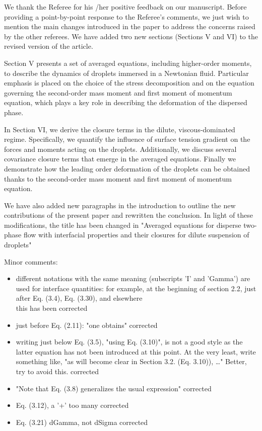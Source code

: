\documentclass[10pt,a4paper]{article}
\newcommand{\tb}[1]{\color{blue}#1\color{black}}
\begin{document}
\tb{
We thank the Referee for his /her positive feedback on our manuscript. 
Before providing a point-by-point response to the Referee’s comments, we just wish to mention the main changes introduced in the paper to address the concerns raised by the other referees.
We have added two new sections (Sections V and VI) to the revised version of the article.

Section V presents a set of averaged equations, including higher-order moments, to describe the dynamics of droplets immersed in a Newtonian fluid. 
Particular emphasis is placed on the choice of the stress decomposition and on the equation governing the second-order mass moment and first moment of momentum equation, which plays a key role in describing the deformation of the dispersed phase.

In Section VI, we derive the closure terms in the dilute, viscous-dominated regime. 
Specifically, we quantify the influence of surface tension gradient on the forces and moments acting on the droplets. 
Additionally, we discuss several covariance closure terms that emerge in the averaged equations.
Finally we demonstrate how the leading order deformation of the droplets can be obtained thanks to the second-order mass moment and first moment of momentum equation.

We have also added new paragraphs in the introduction to outline the new contributions of the present paper and rewritten the conclusion.
In light of these modifications, the title has been changed in "Averaged equations for disperse two-phase flow with interfacial properties and their closures for dilute suspension of droplets"

}

Minor comments:
\begin{itemize}
    \item  different notations with the same meaning (subscripts 'I' and 'Gamma') are used for interface quantities: for example, at the beginning of section 2.2, just after Eq. (3.4), Eq. (3.30), and elsewhere
    \\
    \tb{this has been corrected}
    \item just before Eq. (2.11): "one obtains" \tb{corrected}
    \item writing just below Eq. (3.5), "using Eq. (3.10)", is not a good style as the latter equation has not been introduced at this point. At the very least, write something like, "as will become clear in Section 3.2. (Eq. 3.10)), …" Better, try to avoid this. \tb{corrected}
    \item "Note that Eq. (3.8) generalizes the usual expression" \tb{corrected}
    \item Eq. (3.12), a '+' too many \tb{corrected}
    \item Eq. (3.21) dGamma, not dSigma \tb{corrected}
\end{itemize}
\end{document}
